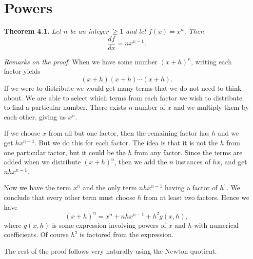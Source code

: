 \section*{Powers}

\indent\textbf{Theorem 4.1.} \textit{Let $n$ be an integer $\ge 1$ and let $f(x) = x^n$. Then
  \[\frac{df}{dx} = nx^{n-1}.\]}

\indent\textit{Remarks on the proof}. When we have some number $(x + h)^n$, writing each factor yields
\[(x + h)(x + h)\cdots (x + h).\]
If we were to distribute we would get many terms that we do not need to think about. We are able to select which
terms from each factor we wish to distribute to find a particular number. There exists $n$ number of $x$ and we
multiply them by each other, giving us $x^n$.

If we choose $x$ from all but one factor, then the remaining factor has $h$ and we get $hx^{n-1}$.
But we do this for each factor. The idea is that it is not the $h$ from one particular factor,
but it could be the $h$ from any factor.
Since the terms are added when we distribute $(x + h)^n$, then we add the $n$ instances of $hx$, and
get $nhx^{n-1}$.

Now we have the term $x^n$ and the only term $nhx^{n-1}$ having a factor of $h^1$. We conclude that every other
term must choose $h$ from at least two factors. Hence we have
\[(x + h)^n = x^n + nhx^{n-1} + h^2g(x, h),\]
where $g(x,h)$ is some expression involving powers of $x$ and $h$ with numerical coefficients. Of course $h^2$
is factored from the expression.

The rest of the proof follows very naturally using the Newton quotient.
